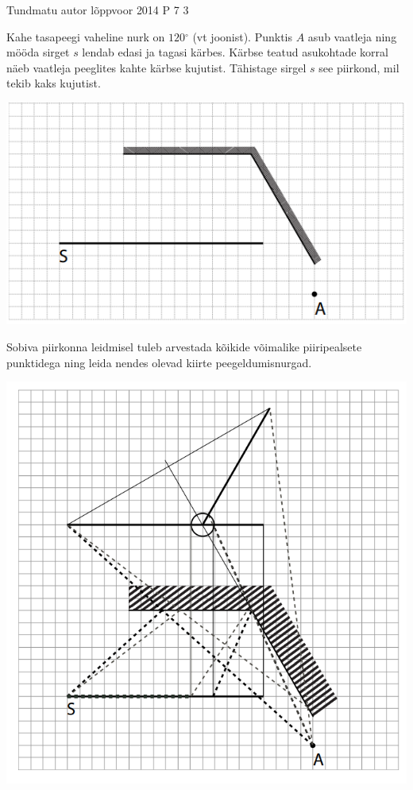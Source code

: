 {Tundmatu autor} %
{lõppvoor} %
{2014} %
{P 7} %
{3} %
{
\ifStatement
Kahe tasapeegi vaheline nurk on $120$$^{\circ}$  (vt joonist). Punktis $A$ asub vaatleja ning mööda sirget $s$ lendab edasi ja tagasi kärbes. Kärbse teatud asukohtade korral näeb vaatleja peeglites kahte kärbse kujutist. Tähistage sirgel $s$ see piirkond, mil tekib kaks kujutist.
\begin{center}
	\includegraphics[width=0.5\linewidth]{2014-v3p-07-yl.PNG}
\end{center}
\fi
\ifHint
Sobiva piirkonna leidmisel tuleb arvestada kõikide võimalike piiripealsete punktidega ning leida nendes olevad kiirte peegeldumisnurgad.
\fi
\ifSolution
\begin{center}
	\includegraphics[width=0.5\linewidth]{2014-v3p-07-lah.PNG}
\end{center}
\fi
}
